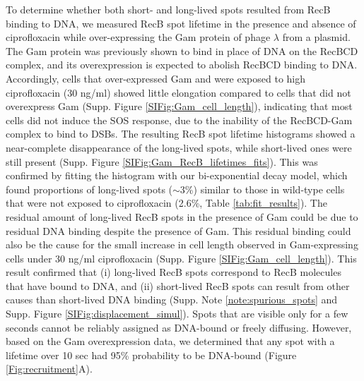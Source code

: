 To determine whether both short- and long-lived spots resulted from RecB binding to DNA, we measured RecB spot lifetime in the presence and absence of ciprofloxacin while over-expressing the Gam protein of phage $\lambda$ from a plasmid. The Gam protein was previously shown to bind in place of DNA on the RecBCD complex\cite{Wilkinson2016}, and its overexpression is expected to abolish RecBCD binding to DNA. Accordingly, cells that over-expressed Gam and were exposed to high ciprofloxacin (30 ng/ml) showed little elongation compared to cells that did not overexpress Gam (Supp. Figure \ref{SIFig:Gam_cell_length}), indicating that most cells did not induce the SOS response, due to the inability of the RecBCD-Gam complex to bind to DSBs. The resulting RecB spot lifetime histograms showed a near-complete disappearance of the long-lived spots, while short-lived ones were still present (Supp. Figure \ref{SIFig:Gam_RecB_lifetimes_fits}). This was confirmed by fitting the histogram with our bi-exponential decay model, which found proportions of long-lived spots ($\sim$3\%) similar to those in wild-type cells that were not exposed to ciprofloxacin (2.6\%, Table \ref{tab:fit_results}). The residual amount of long-lived RecB spots in the presence of Gam could be due to residual DNA binding despite the presence of Gam. This residual binding could also be the cause for the small increase in cell length observed in Gam-expressing cells under 30 ng/ml ciprofloxacin (Supp. Figure \ref{SIFig:Gam_cell_length}). This result confirmed that (i) long-lived RecB spots correspond to RecB molecules that have bound to DNA, and (ii) short-lived RecB spots can result from other causes than short-lived DNA binding (Supp. Note \ref{note:spurious_spots} and Supp. Figure \ref{SIFig:displacement_simul}). Spots that are visible only for a few seconds cannot be reliably assigned as DNA-bound or freely diffusing. However, based on the Gam overexpression data, we determined that any spot with a lifetime over 10 sec had 95\% probability to be DNA-bound (Figure \ref{Fig:recruitment}A).

